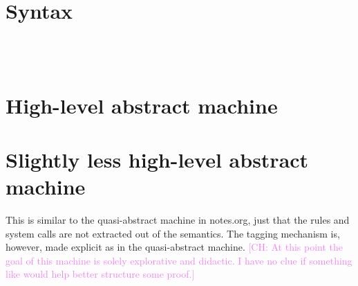 \documentclass{article}
\newcommand{\comm}[3]{\textcolor{#1}{[#2: #3]}}
\newcommand{\ch}[1]{\comm{violet}{CH}{#1}} %
\begin{document}
\section{Syntax}

\ottmetavars\\[0pt]

\ottgrammartabular{
\ottframe\ottinterrule
\ottp\ottinterrule
\ottn\ottinterrule
\ottu\ottinterrule
\ottinstr\ottinterrule
\otte\ottinterrule
\ottS\ottinterrule
}\\[5.0mm]

\section{High-level abstract machine}

\ottdefnsAbstractHighLevelSmallStep

\section{Slightly less high-level abstract machine}

This is similar to the quasi-abstract machine in notes.org, just that
the rules and system calls are not extracted out of the semantics. The
tagging mechanism is, however, made explicit as in the quasi-abstract
machine.
%
\ch{At this point the goal of this machine is solely explorative and
  didactic. I have no clue if something like would help better
  structure some proof.}

\ottgrammartabular{
\ottT\ottinterrule
\ottTy\ottinterrule
\ottaa\ottinterrule
\ottaS\ottinterrule
}\\[5.0mm]

\ottdefnsAbstractSlightlyLessHighLevelSmallStep
\end{document}
